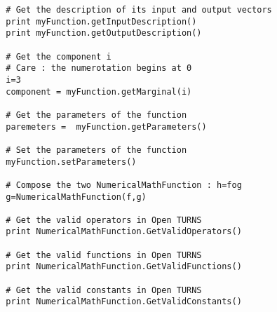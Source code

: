 \begin{lstlisting}
  # Get the description of its input and output vectors
  print myFunction.getInputDescription()
  print myFunction.getOutputDescription()

  # Get the component i
  # Care : the numerotation begins at 0
  i=3
  component = myFunction.getMarginal(i)

  # Get the parameters of the function
  paremeters =  myFunction.getParameters()

  # Set the parameters of the function
  myFunction.setParameters()

  # Compose the two NumericalMathFunction : h=fog
  g=NumericalMathFunction(f,g)

  # Get the valid operators in Open TURNS
  print NumericalMathFunction.GetValidOperators()

  # Get the valid functions in Open TURNS
  print NumericalMathFunction.GetValidFunctions()

  # Get the valid constants in Open TURNS
  print NumericalMathFunction.GetValidConstants()
\end{lstlisting}


